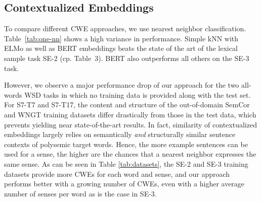 \documentclass[11pt]{article}
\begin{document}
\subsection{Contextualized Embeddings}\begin{table}[t]
\centering
{}
\caption{kNN with  WSD performance (F1\%). Best results for each testset are marked bold.}\label{tab:one-nn}
\end{table}
To compare different CWE approaches, we use  nearest neighbor classification.
Table~\ref{tab:one-nn} shows a high variance in performance. 
Simple kNN with ELMo as well as BERT embeddings beats the state of the art of the lexical sample task SE-2 (cp. Table~3). BERT also outperforms all others on the SE-3 task.

However, we observe a major performance drop of our approach for the two all-words WSD tasks in which no training data is provided along with the test set.
For S7-T7 and S7-T17, the content and structure of the out-of-domain SemCor and WNGT training datasets differ drastically from those in the test data, which prevents yielding near state-of-the-art results.
In fact, similarity of contextualized embeddings largely relies on semantically \emph{and} structurally similar sentence contexts of polysemic target words. 
Hence, the more example sentences can be used for a sense, the higher are the chances that a nearest neighbor expresses the same sense.
As can be seen in Table \ref{tab:datasets}, the SE-2 and SE-3 training datasets provide more CWEs for each word and sense, and our approach performs better with a growing number of CWEs, even with a higher average number of senses per word as is the case in SE-3. 
\end{document}
